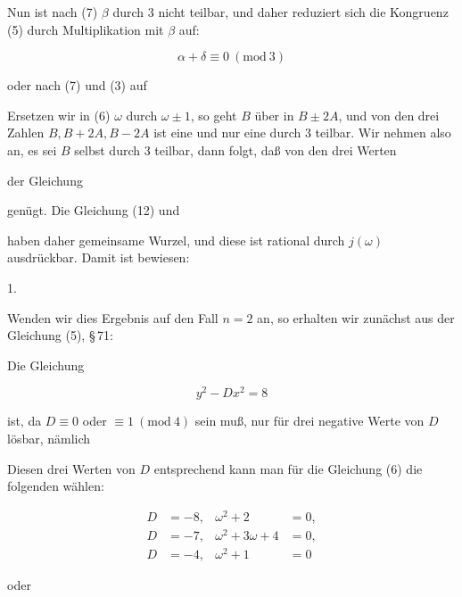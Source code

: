 
Nun ist nach (7) $\beta$ durch 3 nicht teilbar, und daher reduziert
sich die Kongruenz (5) durch Multiplikation mit $\beta$ auf:

\[
\alpha+\delta \equiv 0\ (\mathrm{mod}\ 3)
\]

oder nach (7) und (3) auf


Ersetzen wir in (6) $\omega$ durch $\omega\pm 1$, so geht $B$ über in
$B\pm 2A$, und von den drei Zahlen $B, B+2A, B-2A$ ist eine und nur
eine durch 3 teilbar. Wir nehmen also an, es sei $B$ selbst durch 3
teilbar, dann folgt, daß von den drei Werten


 der Gleichung


genügt. Die Gleichung (12) und


haben daher  gemeinsame Wurzel, und diese ist rational durch
$j(\omega)$ ausdrückbar. Damit ist bewiesen:

1. 

Wenden wir dies Ergebnis auf den Fall $n = 2$ an, so erhalten wir
zunächst aus der Gleichung (5), \S\,71:


Die Gleichung

\[
y^2-Dx^2 = 8
\]

ist, da $D \equiv 0$ oder $\equiv 1\ (\mathrm{mod}\ 4)$ sein muß, nur
für drei negative Werte von $D$ lösbar, nämlich


Diesen drei Werten von $D$ entsprechend kann man für die Gleichung
(6) die folgenden wählen:

\[
\begin{aligned}
D &= -8, & \omega^2+2 &= 0, \\
D &= -7, & \omega^2+3\omega+4 &= 0, \\
D &= -4, & \omega^2+1 &= 0
\end{aligned}
\]

oder
